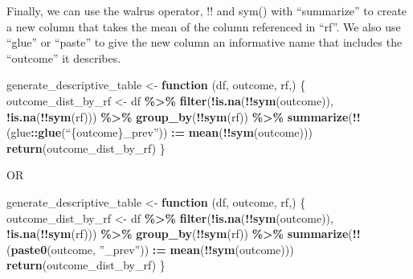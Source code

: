\documentclass[
]{book}
\newenvironment{Shaded}{\begin{snugshade}}{\end{snugshade}}
\newcommand{\ControlFlowTok}[1]{\textcolor[rgb]{0.13,0.29,0.53}{\textbf{#1}}}
\newcommand{\FunctionTok}[1]{\textcolor[rgb]{0.13,0.29,0.53}{\textbf{#1}}}
\newcommand{\NormalTok}[1]{#1}
\newcommand{\OtherTok}[1]{\textcolor[rgb]{0.56,0.35,0.01}{#1}}
\newcommand{\SpecialCharTok}[1]{\textcolor[rgb]{0.81,0.36,0.00}{\textbf{#1}}}
\begin{document}
Finally, we can use the walrus operator, !! and sym() with ``summarize'' to create a new column that takes the mean of the column referenced in ``rf''. We also use ``glue'' or ``paste'' to give the new column an informative name that includes the ``outcome'' it describes.

\begin{Shaded}
\begin{Highlighting}[]
\NormalTok{generate\_descriptive\_table }\OtherTok{\textless{}{-}} \ControlFlowTok{function}\NormalTok{ (df, outcome, rf,) \{}
\NormalTok{  outcome\_dist\_by\_rf }\OtherTok{\textless{}{-}}\NormalTok{ df }\SpecialCharTok{\%\textgreater{}\%} 
  \FunctionTok{filter}\NormalTok{(}\SpecialCharTok{!}\FunctionTok{is.na}\NormalTok{(}\SpecialCharTok{!!}\FunctionTok{sym}\NormalTok{(outcome)), }\SpecialCharTok{!}\FunctionTok{is.na}\NormalTok{(}\SpecialCharTok{!!}\FunctionTok{sym}\NormalTok{(rf))) }\SpecialCharTok{\%\textgreater{}\%} 
  \FunctionTok{group\_by}\NormalTok{(}\SpecialCharTok{!!}\FunctionTok{sym}\NormalTok{(rf)) }\SpecialCharTok{\%\textgreater{}\%}
  \FunctionTok{summarize}\NormalTok{(}\SpecialCharTok{!!}\NormalTok{(glue}\SpecialCharTok{::}\FunctionTok{glue}\NormalTok{(“\{outcome\}\_prev”)) }\SpecialCharTok{:=} \FunctionTok{mean}\NormalTok{(}\SpecialCharTok{!!}\FunctionTok{sym}\NormalTok{(outcome))) }
  \FunctionTok{return}\NormalTok{(outcome\_dist\_by\_rf)}
\NormalTok{\}}
\end{Highlighting}
\end{Shaded}

OR

\begin{Shaded}
\begin{Highlighting}[]
\NormalTok{generate\_descriptive\_table }\OtherTok{\textless{}{-}} \ControlFlowTok{function}\NormalTok{ (df, outcome, rf,) \{}
\NormalTok{  outcome\_dist\_by\_rf }\OtherTok{\textless{}{-}}\NormalTok{ df }\SpecialCharTok{\%\textgreater{}\%} 
  \FunctionTok{filter}\NormalTok{(}\SpecialCharTok{!}\FunctionTok{is.na}\NormalTok{(}\SpecialCharTok{!!}\FunctionTok{sym}\NormalTok{(outcome)), }\SpecialCharTok{!}\FunctionTok{is.na}\NormalTok{(}\SpecialCharTok{!!}\FunctionTok{sym}\NormalTok{(rf))) }\SpecialCharTok{\%\textgreater{}\%} 
  \FunctionTok{group\_by}\NormalTok{(}\SpecialCharTok{!!}\FunctionTok{sym}\NormalTok{(rf)) }\SpecialCharTok{\%\textgreater{}\%}
  \FunctionTok{summarize}\NormalTok{(}\SpecialCharTok{!!}\NormalTok{(}\FunctionTok{paste0}\NormalTok{(outcome, ”\_prev”)) }\SpecialCharTok{:=} \FunctionTok{mean}\NormalTok{(}\SpecialCharTok{!!}\FunctionTok{sym}\NormalTok{(outcome)))}
  \FunctionTok{return}\NormalTok{(outcome\_dist\_by\_rf)}
\NormalTok{\}}
\end{Highlighting}
\end{Shaded}
\end{document}
